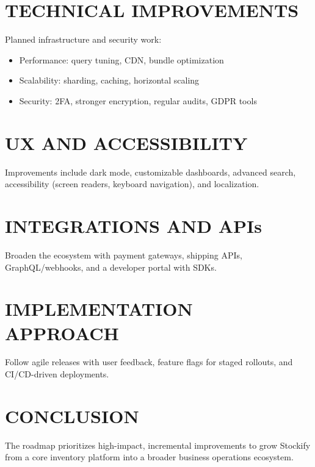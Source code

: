 \section{TECHNICAL IMPROVEMENTS}

Planned infrastructure and security work:
\begin{itemize}
	\item Performance: query tuning, CDN, bundle optimization
	\item Scalability: sharding, caching, horizontal scaling
	\item Security: 2FA, stronger encryption, regular audits, GDPR tools
\end{itemize}

\section{UX AND ACCESSIBILITY}

Improvements include dark mode, customizable dashboards, advanced search, accessibility (screen readers, keyboard navigation), and localization.

\section{INTEGRATIONS AND APIs}

Broaden the ecosystem with payment gateways, shipping APIs, GraphQL/webhooks, and a developer portal with SDKs.

\section{IMPLEMENTATION APPROACH}

Follow agile releases with user feedback, feature flags for staged rollouts, and CI/CD-driven deployments.

\section{CONCLUSION}

The roadmap prioritizes high-impact, incremental improvements to grow Stockify from a core inventory platform into a broader business operations ecosystem.